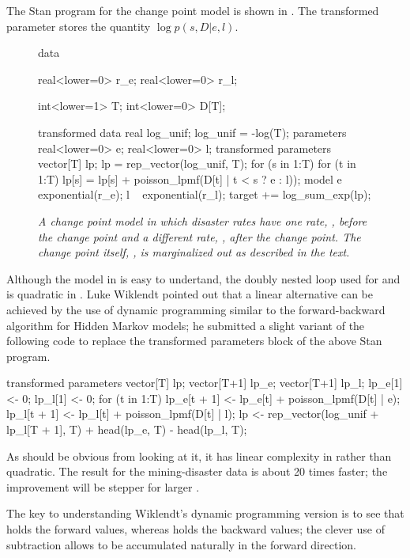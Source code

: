 The Stan program for the change point model is shown in
.  The transformed parameter
 stores the quantity $\log p(s,D|e,l)$.
%
\begin{figure}
\begin{stancode}
data {
  real<lower=0> r_e;
  real<lower=0> r_l;

  int<lower=1> T;
  int<lower=0> D[T];
}
transformed data {
  real log_unif;
  log_unif = -log(T);
}
parameters {
  real<lower=0> e;
  real<lower=0> l;
}
transformed parameters {
  vector[T] lp;
  lp = rep_vector(log_unif, T);
  for (s in 1:T)
    for (t in 1:T)
      lp[s] = lp[s] + poisson_lpmf(D[t] | t < s ? e : l));
}
model {
  e ~ exponential(r_e);
  l ~ exponential(r_l);
  target += log_sum_exp(lp);
}    
\end{stancode}
\vspace*{-6pt}
\caption{\small\it A change point model in which disaster rates
   have one rate, , before the change point and a
  different rate, , after the change point.  The change point
  itself, , is marginalized out as described in the
  text.}\label{change-point-model.figure}
\end{figure}

Although the model in  is easy to
undertand, the doubly nested loop used for  and  is
quadratic in .  Luke Wiklendt pointed out that a linear
alternative can be achieved by the use of dynamic programming similar
to the forward-backward algorithm for Hidden Markov models;  he
submitted a slight variant of the following code to replace the
transformed parameters block of the above Stan program.
%
\begin{stancode}
transformed parameters {
    vector[T] lp;
    {
      vector[T+1] lp_e;
      vector[T+1] lp_l;
      lp_e[1] <- 0;
      lp_l[1] <- 0;
      for (t in 1:T) {
        lp_e[t + 1] <- lp_e[t] + poisson_lpmf(D[t] | e);
        lp_l[t + 1] <- lp_l[t] + poisson_lpmf(D[t] | l);
      }
      lp <- rep_vector(log_unif + lp_l[T + 1], T) + head(lp_e, T) - head(lp_l, T);
    }
  }
\end{stancode}
%
As should be obvious from looking at it, it has linear complexity in
 rather than quadratic.  The result for the mining-disaster
data is about 20 times faster;  the improvement will be stepper for
larger .

The key to understanding Wiklendt's dynamic programming version is to
see that  holds the forward values, whereas
 holds the backward values; the
clever use of subtraction allows  to be accumulated
naturally in the forward direction.


